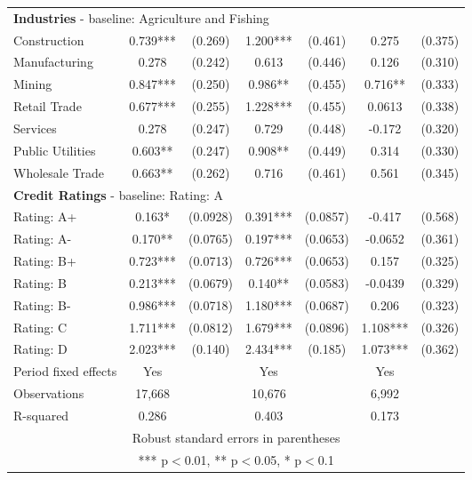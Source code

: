 \documentclass[12pt]{article}
\begin{document}
\begin{table}[H]
{\begin{tabular}{lcccccc}
    \multicolumn{7}{l}{\textbf{Industries} - baseline: Agriculture and Fishing} \\
    Construction  & 0.739*** & (0.269) & 1.200*** & (0.461) & 0.275 & (0.375) \\
    Manufacturing  & 0.278 & (0.242) & 0.613 & (0.446) & 0.126 & (0.310) \\
    Mining & 0.847*** & (0.250) & 0.986** & (0.455) & 0.716** & (0.333) \\
    Retail Trade  & 0.677*** & (0.255) & 1.228*** & (0.455) & 0.0613 & (0.338) \\
    Services & 0.278 & (0.247) & 0.729 & (0.448) & -0.172 & (0.320) \\
    Public Utilities & 0.603** & (0.247) & 0.908** & (0.449) & 0.314 & (0.330) \\
    Wholesale Trade & 0.663** & (0.262) & 0.716 & (0.461) & 0.561 & (0.345) \vspace{3mm} \\
    \multicolumn{7}{l}{\textbf{Credit Ratings} - baseline: Rating: A} \\
    Rating: A+ & 0.163* & (0.0928) & 0.391*** & (0.0857) & -0.417 & (0.568) \\
    Rating: A- &  0.170** & (0.0765) & 0.197*** & (0.0653) & -0.0652 & (0.361) \\
    Rating: B+ & 0.723*** & (0.0713) & 0.726*** & (0.0653) & 0.157 & (0.325) \\
    Rating: B & 0.213*** & (0.0679) & 0.140** & (0.0583) & -0.0439 & (0.329) \\
    Rating: B- & 0.986*** & (0.0718) & 1.180*** & (0.0687) & 0.206 & (0.323) \\
    Rating: C  & 1.711*** & (0.0812) & 1.679*** & (0.0896) & 1.108*** & (0.326) \\
    Rating: D & 2.023*** & (0.140) & 2.434*** & (0.185) & 1.073*** & (0.362)  \\
    \midrule
    Period fixed effects & Yes & & Yes & & Yes & \\
    Observations & 17,668 & & 10,676 & & 6,992 & \\
    R-squared & 0.286 & & 0.403 & & 0.173 & \\
    \bottomrule
    \multicolumn{7}{c}{Robust standard errors in parentheses} \\
    \multicolumn{7}{c}{*** p$<$0.01, ** p$<$0.05, * p$<$0.1} \\
    \end{tabular}%
    }
\end{table}
\end{document}
